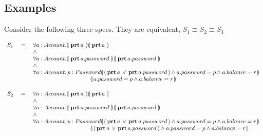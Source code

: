 \subsection{Examples}

\begin{example}
Consider the following three specs. They are equivalent, \ie $S_1 \equiv S_2 \equiv S_3$

$\begin{array}{lcl}
S_1& \ = \ &  \TwoStatesQ {a: Account}{ \inside {a} } {  \inside {a}  }\\
& & \wedge \\
& &  \TwoStatesQ {a: Account}{ \inside {a.password} } {  \inside {a.password}  }\\
& & \wedge\\
& & \forall {a: Account, p: Password}\FirstState{ (\inside {a}\vee\inside {a.password}) \wedge a.password=p \wedge a.balance=r  } \\
& & \strut \hspace{3.5cm} 
                     \SecondState {  a.password=p \wedge a.balance=r   }
\\
\end{array}
$

$\begin{array}{lcl}
S_2& \ = \ &  \TwoStatesQ {a: Account}{ \inside {a} } {  \inside {a}  }\\
& & \wedge \\
& &  \TwoStatesQ {a: Account}{ \inside {a.password} } {  \inside {a.password}  }\\
& & \wedge\\
& & \forall {a: Account, p: Password}\FirstState{ (\inside {a}\vee\inside {a.password}) \wedge a.password=p \wedge a.balance=r  }\\
& & \strut \hspace{3.5cm} 
                     \SecondState{ (\inside {a}\vee\inside {a.password}) \wedge a.password=p \wedge a.balance=r  }
\\
\end{array}
$


\end{example}
